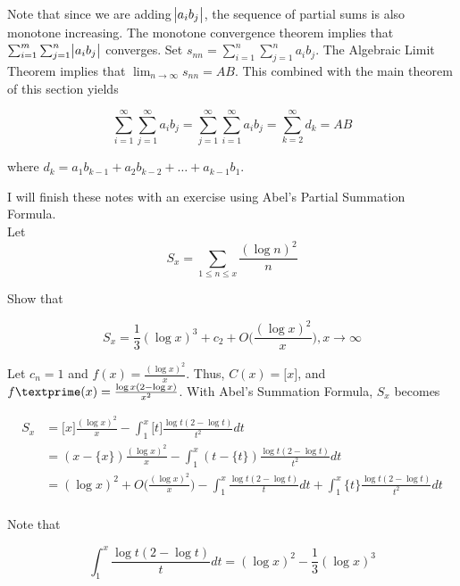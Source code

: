 \documentclass{article}
\begin{document}
Note that since we are adding $\abs{a_i b_j}$, the sequence of partial sums is also monotone increasing. The monotone convergence theorem implies that $\sum_{i=1}^m \sum_{j=1}^n \abs{a_i b_j}$ converges. Set $s_{nn} = \sum_{i=1}^n \sum_{j=1}^n a_i b_j$. The Algebraic Limit Theorem implies that $\lim_{n \to \infty} s_{nn} = AB$. This combined with the main theorem of this section yields 

\begin{equation*}
    \sum_{i=1}^\infty \sum_{j=1}^\infty a_i b_j =  \sum_{j=1}^\infty \sum_{i=1}^\infty a_i b_j = \sum_{k=2}^\infty d_k = AB
\end{equation*}

where $d_k = a_1 b_{k-1} + a_2 b_{k-2} + \dots + a_{k-1}b_1.$

\newpage

I will finish these notes with an exercise using Abel's Partial Summation Formula. \\

Let 
\begin{equation*}
    S_x = \sum_{1\leq n \leq x} \frac{(\log n)^2}{n}
\end{equation*}

Show that 

\begin{equation*}
    S_x = \frac{1}{3}(\log x)^3 + c_2 + O\bigg(\frac{(\log x)^2}{x}\bigg), x \rightarrow \infty
\end{equation*}

Let $c_n = 1$ and $f(x) = \frac{(\log x)^2}{x}$. Thus, $C(x) = \big[x\big]$, and $f\textprime(x) = \frac{\log x(2 - \log x)}{x^2}$. With Abel's Summation Formula, $S_x$ becomes 

\begin{equation*}
\begin{split}
    S_x &= \big[x\big]\frac{(\log x)^2}{x} - \int_{1}^{x} \big[t\big] \frac{\log t(2 - \log t)}{t^2} dt \\
    &= (x - \{x\})\frac{(\log x)^2}{x} - \int_{1}^{x} (t - \{t\}) \frac{\log t(2 - \log t)}{t^2} dt \\
    &= (\log x)^2 + O\bigg(\frac{(\log x)^2}{x}\bigg) - \int_{1}^{x} \frac{\log t(2 - \log t)}{t} dt + 
    \int_{1}^{x} \{t\} \frac{\log t(2 - \log t)}{t^2} dt \\
\end{split}
\end{equation*}

Note that 

\begin{equation*}
    \int_{1}^{x} \frac{\log t(2 - \log t)}{t} dt = (\log x)^2 - \frac{1}{3}(\log x)^3
\end{equation*}
\end{document}
